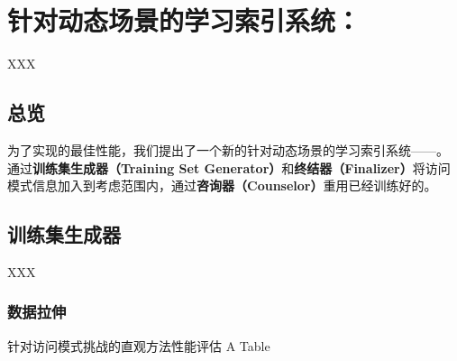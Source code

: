 \chapter{针对动态场景的学习索引系统：\sys}
\label{chap:sys}

XXX

\section{总览}

为了实现{\li}的最佳性能，我们提出了一个新的针对动态场景的学习索引系统{------}{\sys}。
{\sys}通过\textbf{训练集生成器（Training Set Generator）}和\textbf{终结器（Finalizer）}将访问模式信息加入到考虑范围内，通过\textbf{咨询器（Counselor）}重用已经训练好的{\model}。


\section{训练集生成器}

XXX

\subsection{数据拉伸}

\begin{table}[!hpb]
  \centering
  \bicaption[指向一个表格的表目录索引]
    {针对访问模式挑战的直观方法性能评估}
    {A Table}
  \label{tab:pattern-int-sol}
  \begin{tabular}{@{}llr@{}} \toprule
  \end{tabular}
\end{table}

